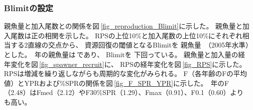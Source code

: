 \subsubsection{Blimitの設定}
親魚量と加入尾数との関係を図\,\ref{fig_reproduction_Blimit}に示した。
親魚量と加入尾数は正の相関を示した。
%
%
RPSの上位10\%と加入尾数の上位10\%にそれぞれ相当する2直線の交点から、
資源回復の閾値となるBlimitを
親魚量\makeatletter{}\makeatother\,
%
（2005年水準）とした。
%
{\ThisYr}\,年の親魚量は\makeatletter{}\makeatother\,であり、
Blimitを
%
%
%
下回っている。
%
%
%
%
%
%
親魚量と加入量の経年変化を図\,\ref{fig_spawner_recruit}に、
RPSの経年変化を図\,\ref{fig_RPS}に示した。
RPSは増減を繰り返しながらも周期的な変化がみられる。
F（各年齢のFの平均値）とYPRおよび\%SPRの関係を図\,\ref{fig_F_SPR_YPR}に示した。
{\ThisYr}\,年のF（\textcolor[cmyk]{0,1,0,0}{2.48}）はFmed（\textcolor[cmyk]{0,1,0,0}{2.12}）やF30\%SPR（\textcolor[cmyk]{0,1,0,0}{1.29}）、Fmax（\textcolor[cmyk]{0,1,0,0}{0.91}）、F0.1（\textcolor[cmyk]{0,1,0,0}{0.60}）よりも高い。
